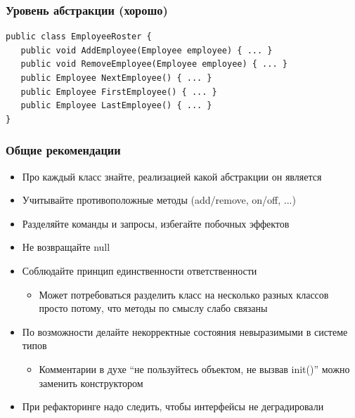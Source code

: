 \documentclass[xetex,mathserif,serif]{beamer}
\begin{document}
	\begin{frame}[fragile]
		\frametitle{Уровень абстракции (хорошо)}
		\begin{verbatim}
public class EmployeeRoster {
   public void AddEmployee(Employee employee) { ... }
   public void RemoveEmployee(Employee employee) { ... }
   public Employee NextEmployee() { ... }
   public Employee FirstEmployee() { ... }
   public Employee LastEmployee() { ... }
}
		\end{verbatim}
	\end{frame}

	\begin{frame}
		\frametitle{Общие рекомендации}
		\begin{itemize}
			\item Про каждый класс знайте, реализацией какой абстракции он является
			\item Учитывайте противоположные методы (add/remove, on/off, ...)
			\item Разделяйте команды и запросы, избегайте побочных эффектов
			\item Не возвращайте null
			\item Соблюдайте принцип единственности ответственности
			\begin{itemize}
				\item Может потребоваться разделить класс на несколько разных классов просто потому, что методы по смыслу слабо связаны
			\end{itemize}
			\item По возможности делайте некорректные состояния невыразимыми в системе типов
			\begin{itemize}
				\item Комментарии в духе ``не пользуйтесь объектом, не вызвав  init()'' можно заменить конструктором
			\end{itemize}
			\item При рефакторинге надо следить, чтобы интерфейсы не деградировали
		\end{itemize}
	\end{frame}
\end{document}
